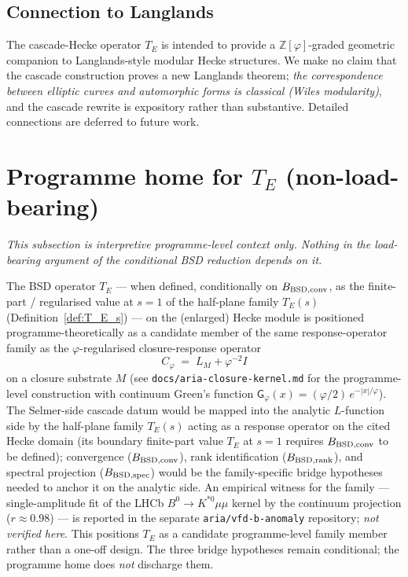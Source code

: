 \documentclass[11pt, a4paper]{amsart}
\theoremstyle{definition}
\newcommand{\Z}{\mathbb{Z}}
\begin{document}
\subsection{Connection to Langlands}

The cascade-Hecke operator $T_E$ is intended to provide a
$\Z[\varphi]$-graded geometric companion to Langlands-style
modular Hecke structures. We make no claim that the cascade
construction proves a new Langlands theorem; \emph{the
correspondence between elliptic curves and automorphic forms is
classical (Wiles modularity)}, and the cascade rewrite is
expository rather than substantive. Detailed connections are
deferred to future work.

\section{Programme home for $T_E$ (non-load-bearing)}\label{sec:aria_home}

\emph{This subsection is interpretive programme-level context only.
Nothing in the load-bearing argument of the conditional BSD
reduction depends on it.}\medskip

The BSD operator $T_E$ --- when defined, conditionally on
$B_{\rm BSD,conv}$, as the finite-part / regularised value at
$s=1$ of the half-plane family $T_E(s)$ (Definition~\ref{def:T_E_s})
--- on the (enlarged) Hecke module is positioned
programme-theoretically as a candidate member of the same
response-operator family as the $\varphi$-regularised
closure-response operator
\[
C_\varphi \;=\; L_M + \varphi^{-2} I
\]
on a closure substrate $M$ (see
\texttt{docs/aria-closure-kernel.md} for the programme-level
construction with continuum Green's function
$\mathsf G_\varphi(x) = (\varphi/2)\,e^{-|x|/\varphi}$).  The
Selmer-side cascade datum would be mapped into the analytic
$L$-function side by the half-plane family $T_E(s)$ acting as a
response operator on the cited Hecke domain (its boundary
finite-part value $T_E$ at $s=1$ requires $B_{\rm BSD,conv}$ to be
defined);
convergence ($B_{\rm BSD,conv}$), rank identification
($B_{\rm BSD,rank}$), and spectral projection
($B_{\rm BSD,spec}$) would be the family-specific bridge
hypotheses needed to anchor it on the analytic side.  An empirical
witness for the family --- single-amplitude fit of the LHCb
$B^0\to K^{*0}\mu\mu$ kernel by the continuum projection
($r \approx 0.98$) --- is reported in the separate
\texttt{aria/vfd-b-anomaly} repository; \emph{not verified here}.
This positions $T_E$ as a candidate programme-level family member
rather than a one-off design.  The three bridge hypotheses remain
conditional; the programme home does \emph{not} discharge them.
\end{document}
